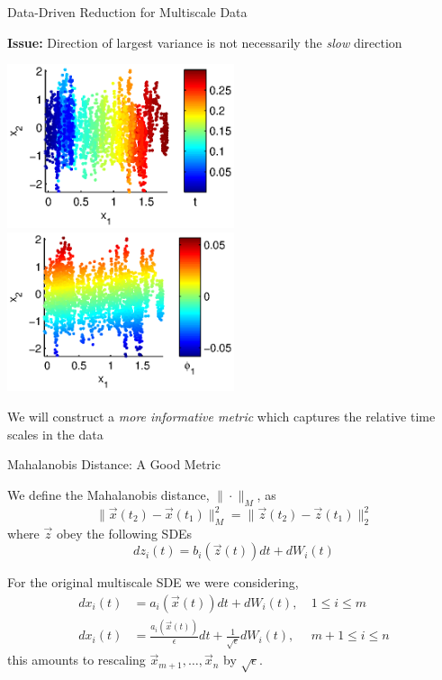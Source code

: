 \documentclass[12pt]{beamer}
\begin{document}
\begin{frame}{Data-Driven Reduction for Multiscale Data}

{\bf Issue:} Direction of largest variance is not necessarily the {\em slow} direction

\includegraphics[width=0.5\textwidth]{data_init}
\includegraphics[width=0.5\textwidth]{data_linear_DMAPS}

We will construct a {\em more informative metric} which captures the relative time scales in the data

\end{frame}

\begin{frame}{Mahalanobis Distance: A Good Metric}

We define the Mahalanobis distance, $\| \cdot \|_M$, as
$$\| \vec{x}(t_2) - \vec{x}(t_1) \|^2_M = \| \vec{z}(t_2) - \vec{z}(t_1) \|^2_2$$
where $\vec{z}$ obey the following SDEs
$$dz_i(t) = b_i(\vec{z}(t)) dt + dW_i(t)$$


For the original multiscale SDE we were considering,
\begin{equation*}
\begin{aligned}
dx_i(t) &= a_i(\vec{x}(t)) dt + dW_i(t), & \: 1 \le i \le m \\
dx_i(t) &= \frac{a_i(\vec{x}(t))}{\epsilon} dt + \frac{1}{\sqrt{\epsilon}} dW_i(t) , & \: m+1 \le i \le n
\end{aligned}
\end{equation*}
this amounts to rescaling $\vec{x}_{m+1}, \dots, \vec{x}_n$  by $\sqrt{\epsilon}$. 


\end{frame}
\end{document}
